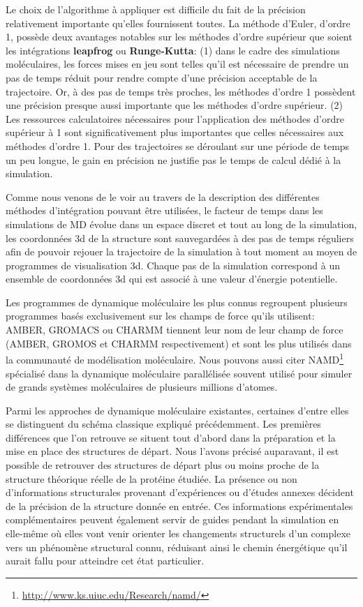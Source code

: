 Le choix de l'algorithme à appliquer est difficile du fait de la précision relativement importante qu'elles fournissent toutes. La méthode d'Euler, d'ordre 1, possède deux avantages notables sur les méthodes d'ordre supérieur que soient les intégrations \textbf{leapfrog} ou \textbf{Runge-Kutta}: (1) dans le cadre des simulations moléculaires, les forces mises en jeu sont telles qu'il est nécessaire de prendre un pas de temps réduit pour rendre compte d'une précision acceptable de la trajectoire. Or, à des pas de temps très proches, les méthodes d'ordre 1 possèdent une précision presque aussi importante que les méthodes d'ordre supérieur. (2) Les ressources calculatoires nécessaires pour l'application des méthodes d'ordre supérieur à 1 sont significativement plus importantes que celles nécessaires aux méthodes d'ordre 1. Pour des trajectoires se déroulant sur une période de temps un peu longue, le gain en précision ne justifie pas le temps de calcul dédié à la simulation.  

Comme nous venons de le voir au travers de la description des différentes méthodes d'intégration pouvant être utilisées, le facteur de temps dans les simulations de MD évolue dans un espace discret et tout au long de la simulation, les coordonnées 3d de la structure sont sauvegardées à des pas de temps réguliers afin de pouvoir rejouer la trajectoire de la simulation à tout moment au moyen de programmes de visualisation 3d. Chaque pas de la simulation correspond à un ensemble de coordonnées 3d qui est associé à une valeur d'énergie potentielle.

Les programmes de dynamique moléculaire les plus connus regroupent plusieurs programmes basés exclusivement sur les champs de force qu'ils utilisent: AMBER, GROMACS ou CHARMM tiennent leur nom de leur champ de force (AMBER, GROMOS et CHARMM respectivement) et sont les plus utilisés dans la communauté de modélisation moléculaire. Nous pouvons aussi citer NAMD\footnote{\url{http://www.ks.uiuc.edu/Research/namd/}} \cite{phillips2005scalable} spécialisé dans la dynamique moléculaire parallélisée souvent utilisé pour simuler de grands systèmes moléculaires de plusieurs millions d'atomes.

Parmi les approches de dynamique moléculaire existantes, certaines d'entre elles se distinguent du schéma classique expliqué précédemment.
Les premières différences que l'on retrouve se situent tout d'abord dans la préparation et la mise en place des structures de départ. Nous l'avons précisé auparavant, il est possible de retrouver des structures de départ plus ou moins proche de la structure théorique réelle de la protéine étudiée. La présence ou non d'informations structurales provenant d'expériences ou d'études annexes décident de la précision de la structure donnée en entrée.
Ces informations expérimentales complémentaires peuvent également servir de guides pendant la simulation en elle-même où elles vont venir orienter les changements structurels d'un complexe vers un phénomène structural connu, réduisant ainsi le chemin énergétique qu'il aurait fallu pour atteindre cet état particulier.

